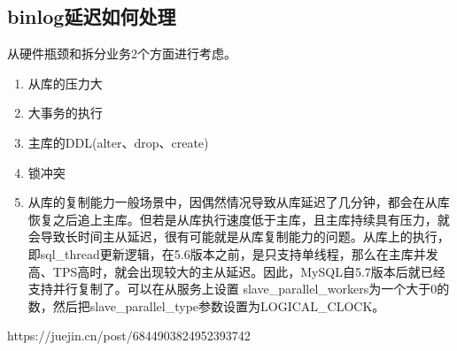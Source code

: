 \documentclass[../../../interview-questions.tex]{subfiles}
\begin{document}
\subsection{binlog延迟如何处理}

从硬件瓶颈和拆分业务2个方面进行考虑。

\begin{enumerate}
    \item {从库的压力大}
    \item {大事务的执行}
    \item {主库的DDL(alter、drop、create)}
    \item {锁冲突}
    \item {从库的复制能力}一般场景中，因偶然情况导致从库延迟了几分钟，都会在从库恢复之后追上主库。但若是从库执行速度低于主库，且主库持续具有压力，就会导致长时间主从延迟，很有可能就是从库复制能力的问题。从库上的执行，即sql\_thread更新逻辑，在5.6版本之前，是只支持单线程，那么在主库并发高、TPS高时，就会出现较大的主从延迟。因此，MySQL自5.7版本后就已经支持并行复制了。可以在从服务上设置 slave\_parallel\_workers为一个大于0的数，然后把slave\_parallel\_type参数设置为LOGICAL\_CLOCK。
\end{enumerate}


https://juejin.cn/post/6844903824952393742
\end{document}
